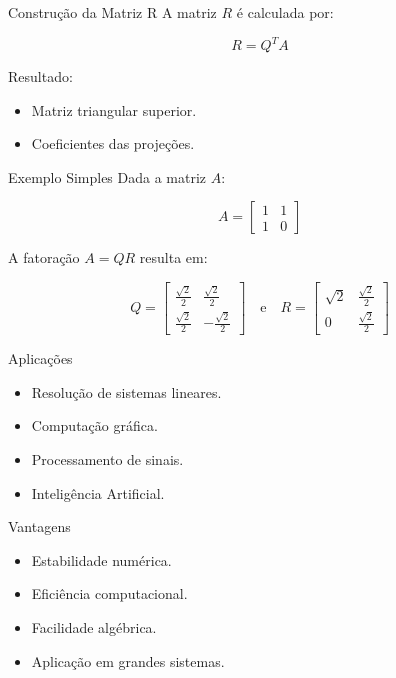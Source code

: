 \documentclass{beamer}
\begin{document}
\begin{frame}{Construção da Matriz R}
A matriz $R$ é calculada por:

\[
R = Q^TA
\]

Resultado:
\begin{itemize}
    \item Matriz triangular superior.
    \item Coeficientes das projeções.
\end{itemize}
\end{frame}

\begin{frame}{Exemplo Simples}
Dada a matriz $A$:

\[
A =
\begin{bmatrix}
1 & 1 \\
1 & 0
\end{bmatrix}
\]

A fatoração $A = QR$ resulta em:

\[
Q = 
\begin{bmatrix} 
\frac{\sqrt{2}}{2} & \frac{\sqrt{2}}{2} \\[6pt] 
\frac{\sqrt{2}}{2} & -\frac{\sqrt{2}}{2} 
\end{bmatrix}
\quad \text{e} \quad 
R = 
\begin{bmatrix} 
\sqrt{2} & \frac{\sqrt{2}}{2} \\[6pt] 
0 & \frac{\sqrt{2}}{2} 
\end{bmatrix}
\]
\end{frame}

\begin{frame}{Aplicações}
\begin{itemize}
    \item Resolução de sistemas lineares.
    \item Computação gráfica.
    \item Processamento de sinais.
    \item Inteligência Artificial.
\end{itemize}
\end{frame}

\begin{frame}{Vantagens}
\begin{itemize}
    \item Estabilidade numérica.
    \item Eficiência computacional.
    \item Facilidade algébrica.
    \item Aplicação em grandes sistemas.
\end{itemize}
\end{frame}
\end{document}
